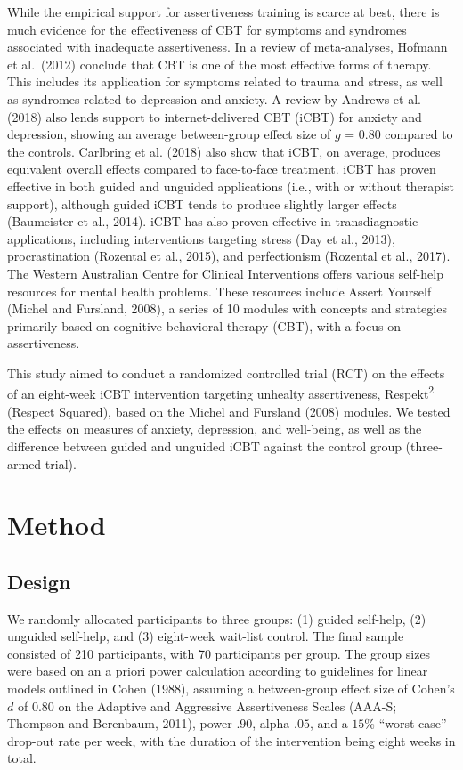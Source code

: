 \documentclass[preprint,
3p]{elsarticle} %
\begin{document}
While the empirical support for assertiveness training is scarce at
best, there is much evidence for the effectiveness of CBT for symptoms
and syndromes associated with inadequate assertiveness. In a review of
meta-analyses, Hofmann et al.~(2012) conclude that CBT is one of the
most effective forms of therapy. This includes its application for
symptoms related to trauma and stress, as well as syndromes related to
depression and anxiety. A review by Andrews et al. (2018) also lends
support to internet-delivered CBT (iCBT) for anxiety and depression,
showing an average between-group effect size of \(g\) = \(0.80\)
compared to the controls. Carlbring et al. (2018) also show that iCBT,
on average, produces equivalent overall effects compared to face-to-face
treatment. iCBT has proven effective in both guided and unguided
applications (i.e., with or without therapist support), although guided
iCBT tends to produce slightly larger effects (Baumeister et al., 2014).
iCBT has also proven effective in transdiagnostic applications,
including interventions targeting stress (Day et al., 2013),
procrastination (Rozental et al., 2015), and perfectionism (Rozental et
al., 2017). The Western Australian Centre for Clinical Interventions
offers various self-help resources for mental health problems. These
resources include Assert Yourself (Michel and Fursland, 2008), a series
of 10 modules with concepts and strategies primarily based on cognitive
behavioral therapy (CBT), with a focus on assertiveness.

This study aimed to conduct a randomized controlled trial (RCT) on the
effects of an eight-week iCBT intervention targeting unhealty
assertiveness, Respekt\textsuperscript{2} (Respect Squared), based on
the Michel and Fursland (2008) modules. We tested the effects on
measures of anxiety, depression, and well-being, as well as the
difference between guided and unguided iCBT against the control group
(three-armed trial).

\hypertarget{method}{%
\section{Method}\label{method}}

\hypertarget{design}{%
\subsection{Design}\label{design}}

We randomly allocated participants to three groups: (1) guided
self-help, (2) unguided self-help, and (3) eight-week wait-list control.
The final sample consisted of 210 participants, with 70 participants per
group. The group sizes were based on an a priori power calculation
according to guidelines for linear models outlined in Cohen (1988),
assuming a between-group effect size of Cohen's \(d\) of \(0.80\) on the
Adaptive and Aggressive Assertiveness Scales (AAA-S; Thompson and
Berenbaum, 2011), power \(.90\), alpha \(.05\), and a \(15\)\% ``worst
case'' drop-out rate per week, with the duration of the intervention
being eight weeks in total.
\end{document}
